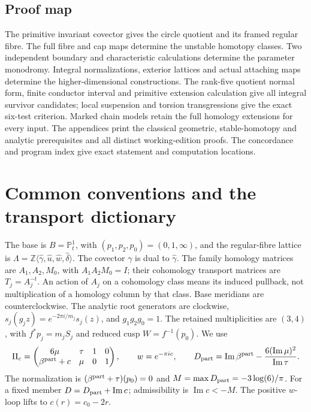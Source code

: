 \subsection*{Proof map}
The primitive invariant covector gives the circle quotient and its framed
regular fibre. The full fibre and cap maps determine the unstable homotopy
classes. Two independent boundary and characteristic calculations determine
the parameter monodromy. Integral normalizations, exterior lattices and
actual attaching maps determine the higher-dimensional constructions.
The rank-five quotient normal form, finite conductor interval and primitive
extension calculation give all integral survivor candidates; local
suspension and torsion transgressions give the exact six-test criterion.
Marked chain models retain the full homology extensions for every input.
The appendices print the classical geometric, stable-homotopy and analytic
prerequisites and all distinct working-edition proofs. The concordance and
program index give exact statement and computation locations.

\clearpage
\section{Common conventions and the transport dictionary}\label{sec:III:conventions}
The base is $B=\mathbb P^1_t$, with $(p_1,p_2,p_0)=(0,1,\infty)$,
and the regular-fibre lattice is
$\Lambda=\mathbb Z\langle\widehat\gamma,\widehat u,\widehat w,\widehat\delta\rangle$.
The covector $\gamma$ is dual to $\widehat\gamma$.
The family homology matrices are $A_1,A_2,M_0$, with
$A_1A_2M_0=I$; their cohomology transport matrices are
$T_j=A_j^{-t}$. An action of $A_j$ on a cohomology class means its
induced pullback, not multiplication of a homology column by that class.
Base meridians are counterclockwise. The analytic root generators are
clockwise, $s_j(g_jz)=e^{-2\pi i/m_j}s_j(z)$, and
$g_1g_2g_0=1$. The retained multiplicities are $(3,4)$, with
$f^*p_j=m_jS_j$ and reduced cusp $W=f^{-1}(p_0)$.
We use
\[
\Pi_c=\begin{pmatrix}6\mu&\tau&1&0\\\beta^{\rm part}+c&\mu&0&1\end{pmatrix},
\qquad w=e^{-\pi i c},\qquad
D_{\rm part}=\operatorname{Im}\beta^{\rm part}
-\frac{6(\operatorname{Im}\mu)^2}{\operatorname{Im}\tau}.
\]
The normalization is $(\beta^{\rm part}+\tau)(p_0)=0$ and
$M=\max D_{\rm part}=-3\log(6)/\pi$.
For a fixed member $D=D_{\rm part}+\operatorname{Im}c$;
admissibility is $\operatorname{Im}c<-M$.
The positive $w$-loop lifts to $c(r)=c_0-2r$.

